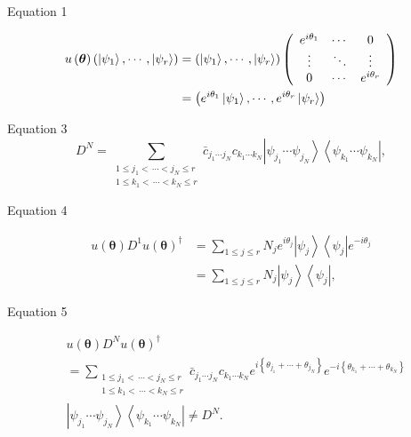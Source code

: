 \documentclass[aps]{revtex4}%
\begin{document}
\preprint{ }


Equation 1%

\begin{align*}
u\left(  \boldsymbol{\theta}\right)  \left(  \left\vert \psi_{1}\right\rangle
,\cdots,\left\vert \psi_{r}\right\rangle \right)   &  =\left(  \left\vert
\psi_{1}\right\rangle ,\cdots,\left\vert \psi_{r}\right\rangle \right)
\left(
\begin{array}
[c]{ccc}%
e^{i\theta_{1}} & \cdots & 0\\
\vdots & \ddots & \vdots\\
0 & \cdots & e^{i\theta_{r}}%
\end{array}
\right)  \\
&  =\left(  e^{i\theta_{1}}\left\vert \psi_{1}\right\rangle ,\cdots
,e^{i\theta_{r}}\left\vert \psi_{r}\right\rangle \right)
\end{align*}


Equation 3%
\[
D^{N}=\sum_{\substack{1\leq j_{1}<\,\cdots<j_{N}\leq r\\1\leq k_{1}%
<\,\cdots<k_{N}\leq r}}\bar{c}_{j_{1}\cdots j_{N}}c_{k_{1}\cdots k_{N}%
}\left\vert \psi_{j_{1}}\cdots\psi_{j_{N}}\right\rangle \left\langle
\psi_{k_{1}}\cdots\psi_{k_{N}}\right\vert ,
\]


Equation 4%

\begin{align*}
u\left(  \boldsymbol{\theta}\right)  D^{1}u\left(  \boldsymbol{\theta}\right)
^{\dagger}  &  =\sum_{1\leq j\leq r}N_{j}e^{i\theta_{j}}\left\vert \psi
_{j}\right\rangle \left\langle \psi_{j}\right\vert e^{-i\theta_{j}}\\
&  =\sum_{1\leq j\leq r}N_{j}\left\vert \psi_{j}\right\rangle \left\langle
\psi_{j}\right\vert ,
\end{align*}


Equation 5%

\begin{align*}
&  u\left(  \boldsymbol{\theta}\right)  D^{N}u\left(  \boldsymbol{\theta
}\right)  ^{\dagger}\\
&  =\sum_{\substack{1\leq j_{1}<\,\cdots<j_{N}\leq r\\1\leq k_{1}%
<\,\cdots<k_{N}\leq r}}\bar{c}_{j_{1}\cdots j_{N}}c_{k_{1}\cdots k_{N}%
}e^{i\left\{  \theta_{j_{1}}+\cdots+\theta_{j_{N}}\right\}  }e^{-i\left\{
\theta_{k_{1}}+\cdots+\theta_{k_{N}}\right\}  }\\
&  \left\vert \psi_{j_{1}}\cdots\psi_{j_{N}}\right\rangle \left\langle
\psi_{k_{1}}\cdots\psi_{k_{N}}\right\vert \neq D^{N}.
\end{align*}
\end{document}

